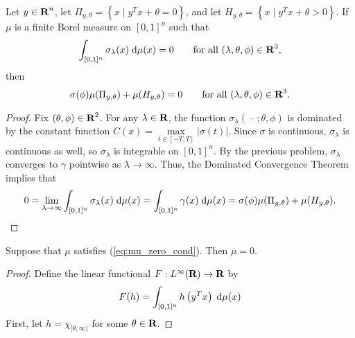 \documentclass{homework}
\begin{document}
	\question
	\newcommand{\zset}{\Pi_{y,\theta}}
	\newcommand{\pset}{H_{y,\theta}}
	Let $y \in \textbf{R}^n$, let $\zset = \left\{x\mid y^Tx + \theta = 0\right\}$, and let $\pset=\left\{x\mid y^Tx+\theta > 0\right\}$. If $\mu$ is a finite Borel measure on $[0,1]^n$ such that
	\begin{equation}
		\label{eq:mu_zero_cond}
		\int_{[0,1]^n}\sigma_\lambda(x)\;\text{d}\mu(x) = 0 \qquad \text{for all } (\lambda, \theta, \phi)\in\textbf{R}^3,
	\end{equation}
	then
	\begin{equation}
		\sigma(\phi)\mu(\zset) + \mu(\pset) = 0\qquad \text{for all } (\lambda, \theta, \phi)\in\R^3.
	\end{equation}
	\begin{proof}
		Fix $(\theta,\phi)\in\textbf{R}^2$. For any $\lambda \in \textbf{R}$, the function $\sigma_\lambda(\,\cdot\,;\theta,\phi)$ is dominated by the constant function $C(x) = \max\limits_{t\in[-T,T]}|\sigma(t)|$. Since $\sigma$ is continuous, $\sigma_\lambda$ is continuous as well, so $\sigma_\lambda$ is integrable on $[0,1]^n$. By the previous problem, $\sigma_\lambda$ converges to $\gamma$ pointwise as $\lambda \to \infty$. Thus, the Dominated Convergence Theorem implies that
		\begin{equation}
			0=\lim_{\lambda\to\infty}\int_{[0,1]^n}\sigma_\lambda(x)\dee\mu(x) = \int_{[0,1]^n} \gamma(x)\dee\mu(x) = \sigma(\phi)\mu(\zset) + \mu(\pset).
		\end{equation}
	\end{proof}
	
	\question
	Suppose that $\mu$ satisfies (\ref{eq:mu_zero_cond}). Then $\mu = 0$. 
	\begin{proof}
		Define the linear functional $F: L^\infty(\textbf{R}) \to \textbf{R}$ by
		\begin{equation}
			F(h) = \int_{[0,1]^n}h\left(y^Tx\right)\;\text{d}\mu(x)
		\end{equation}
		First, let $h = \chi_{[\theta,\infty)}$ for some $\theta \in \textbf{R}$.
	\end{proof}
	
	\question
	
	
\end{document}
